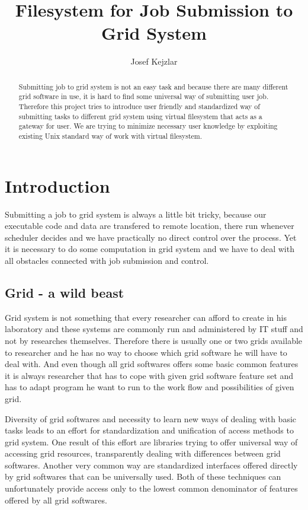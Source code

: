 \documentclass[a4paper,10pt,twocolumn]{article}
\title{Filesystem for Job Submission to Grid System}
\author{Josef Kejzlar}
\begin{document}
\maketitle

\begin{abstract}
Submitting job to grid system is not an easy task and because there are many different grid software in use, it is hard to find some universal way of submitting user job. Therefore this project tries to introduce user friendly and standardized way of submitting tasks to different grid system using virtual filesystem that acts as a gateway for user. We are trying to minimize necessary user knowledge by exploiting existing Unix standard way of work with virtual filesystem.
\end{abstract}



\section{Introduction}

Submitting a job to grid system is always a little bit tricky, because our executable code and data are transfered to remote location, there run whenever scheduler decides and we have practically no direct control over the process. Yet it is necessary to do some computation in grid system and we have to deal with all obstacles connected with job submission and control.

\subsection{Grid - a wild beast}
Grid system is not something that every researcher can afford to create in his laboratory and these systems are commonly run and administered by IT stuff and not by researches themselves. Therefore there is usually one or two grids available to researcher and he has no way to choose which grid software he will have to deal with. And even though all grid softwares offers some basic common features it is always researcher that has to cope with given grid software feature set and has to adapt program he want to run to the work flow and possibilities of given grid. 

Diversity of grid softwares and necessity to learn new ways of dealing with basic tasks leads to an effort for standardization and unification of access methods to grid system. One result of this effort are libraries trying to offer universal way of accessing grid resources, transparently dealing with differences between grid softwares. Another very common way are standardized interfaces offered directly by grid softwares that can be universally used. Both of these techniques can unfortunately provide access only to the lowest common denominator of features offered by all grid softwares.
\end{document}
